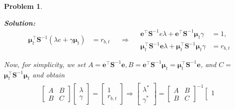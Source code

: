 \documentclass[11pt]{article}
\theoremstyle{plain} %
\newtheorem{problem}[theorem]{Problem}
\newenvironment{solution}
{\color{C2}\normalfont\begin{framed}\begingroup\textbf{Solution:} }
  {\endgroup\end{framed}}
\theoremstyle{remark}
\begin{document}
\begin{problem}
\begin{enumerate}[label=(\alph*)]
\begin{solution}
$$\begin{aligned}
              \boldsymbol{\mu}_t^{\top} \boldsymbol{S}^{-1}(\lambda e+\gamma \boldsymbol{\mu}_t) & =r_{b, t}
            \end{aligned} \quad \Longrightarrow \quad \begin{aligned}
              \boldsymbol{e}^{\top} \boldsymbol{S}^{-1} e \lambda+\boldsymbol{e}^{\top} \boldsymbol{S}^{-1} \boldsymbol{\mu}_t \gamma                      & =1,       \\
              \boldsymbol{\mu}_t^{\top} \boldsymbol{S}^{-1} \boldsymbol{e} \lambda+\boldsymbol{\mu}_t^{\top} \boldsymbol{S}^{-1} \boldsymbol{\mu}_t \gamma & =r_{b, t}
            \end{aligned}
          $$

          Now, for simplicity, we set $A=\boldsymbol{e}^{\top}
            \boldsymbol{S}^{-1} \boldsymbol{e}, B=\boldsymbol{e}^{\top}
            \boldsymbol{S}^{-1}
            \boldsymbol{\mu}_t=\boldsymbol{\mu}_t^{\top}
            \boldsymbol{S}^{-1} \boldsymbol{e}$, and $C=$
          $\boldsymbol{\mu}_t^{\top} \boldsymbol{S}^{-1}
            \boldsymbol{\mu}_t$ and obtain
          \begin{align}
            \begin{gathered}
              {\left[\begin{array}{ll}
                    A & B \\
                    B & C
                  \end{array}\right]\left[\begin{array}{l}
                    \lambda \\
                    \gamma
                  \end{array}\right]=\left[\begin{array}{c}
                    1 \\
                    r_{b, t}
                  \end{array}\right]}
              \Longrightarrow
              \left[\begin{array}{l}
                  \lambda^* \\
                  \gamma^*
                \end{array}\right]=\left[\begin{array}{ll}
                  A & B \\
                  B & C
                \end{array}\right]^{-1}\left[\begin{array}{c}
                  1 \\

\end{array}
\end{gathered}
\end{align}
\end{solution}
\end{enumerate}
\end{problem}
\end{document}
